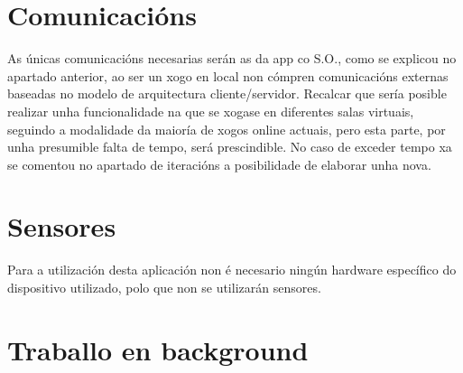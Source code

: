\section {Comunicacións}
As únicas comunicacións necesarias serán as da app co S.O., como se explicou no apartado anterior, ao ser un xogo en local non cómpren comunicacións externas baseadas no modelo de arquitectura cliente/servidor. Recalcar que sería posible realizar unha funcionalidade na que se xogase en diferentes salas virtuais, seguindo a modalidade da maioría de xogos online actuais, pero esta parte, por unha presumible falta de tempo, será prescindible. No caso de exceder tempo xa se comentou no apartado de iteracións a posibilidade de elaborar unha nova.

\section {Sensores}
Para a utilización desta aplicación non é necesario ningún hardware específico do dispositivo utilizado, polo que non se utilizarán sensores. 

\section {Traballo en background} 





\let\cleardoublepage=\clearpage